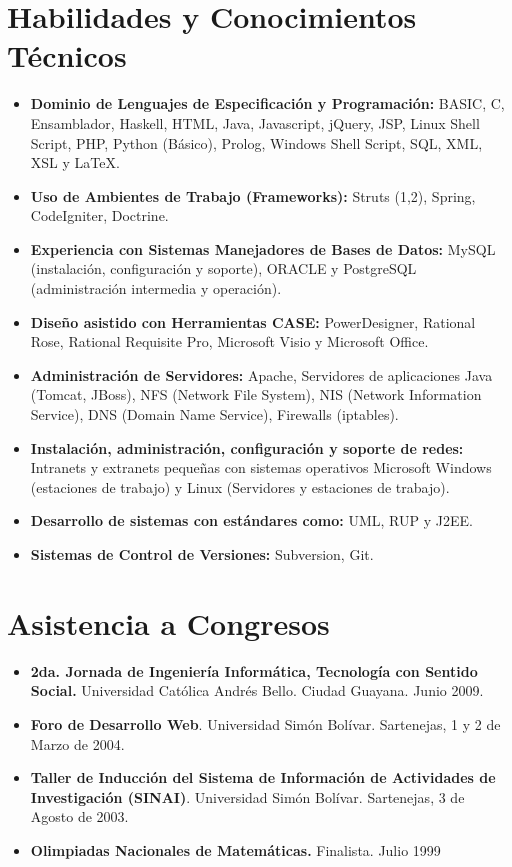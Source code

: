 \documentclass[letterpaper,11pt]{report}
\begin{document}
\section*{Habilidades y Conocimientos Técnicos}
\begin{itemize}
\item
\textbf{Dominio de Lenguajes de Especificación y Programación:} BASIC, C, Ensamblador, Haskell, HTML, Java, Javascript, jQuery, JSP, Linux Shell Script, PHP, Python (Básico), Prolog, Windows Shell Script, SQL, XML, XSL y LaTeX.
\item
\textbf{Uso de Ambientes de Trabajo (Frameworks):} Struts (1,2), Spring, CodeIgniter, Doctrine.
\item
\textbf{Experiencia con Sistemas Manejadores de Bases de Datos:} MySQL (instalación, configuración y soporte), ORACLE y PostgreSQL (administración intermedia y operación).
\item
\textbf{Dise\~{n}o asistido con Herramientas CASE:} PowerDesigner, Rational Rose, Rational Requisite Pro, Microsoft Visio y Microsoft Office.
\item
\textbf{Administración de Servidores:} Apache, Servidores de aplicaciones Java (Tomcat, JBoss), NFS (Network File System), NIS (Network Information Service), DNS (Domain Name Service), Firewalls (iptables).
\item
\textbf{Instalación, administración, configuración y soporte de redes:} Intranets y extranets peque\~{n}as con sistemas operativos Microsoft Windows (estaciones de trabajo) y Linux (Servidores y estaciones de trabajo).
\item
\textbf{Desarrollo de sistemas con estándares como:} UML, RUP y J2EE.
\item
\textbf{Sistemas de Control de Versiones:} Subversion, Git.
\end{itemize}

\section*{Asistencia a Congresos}
\begin{itemize}
\item
\textbf{2da. Jornada de Ingeniería Informática, Tecnología con Sentido Social.} Universidad Católica Andrés Bello. Ciudad Guayana. Junio 2009.
\item
\textbf{Foro de Desarrollo Web}. Universidad Simón Bolívar. Sartenejas, 1 y 2 de Marzo de 2004.
\item
\textbf{Taller de Inducción del Sistema de Información de Actividades de Investigación (SINAI)}. Universidad Simón Bolívar. Sartenejas, 3 de Agosto de 2003.
\item
\textbf{Olimpiadas Nacionales de Matemáticas.} Finalista. Julio 1999
\end{itemize}
\end{document}
